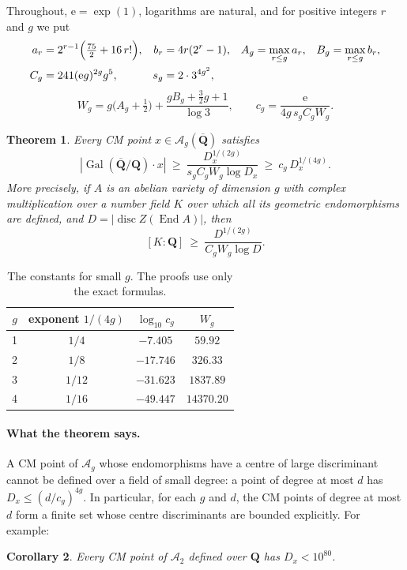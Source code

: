 \documentclass[11pt,a4paper]{article}
\theoremstyle{plain}
\newtheorem{theorem}{Theorem}
\newtheorem{corollary}[theorem]{Corollary}
\theoremstyle{remark}
\newcommand{\Q}{\mathbf Q}
\newcommand{\Ag}{\mathcal A_g}
\newcommand{\Gal}{\operatorname{Gal}}
\newcommand{\End}{\operatorname{End}}
\newcommand{\disc}{\operatorname{disc}}
\newcommand{\Qb}{\overline{\mathbf Q}}
\begin{document}
Throughout, $\mathrm e=\exp(1)$, logarithms are natural, and for positive integers $r$ and $g$ we put
\begin{align*}
 a_r&=2^{r-1}\Bigl(\tfrac{75}2+16\,r!\Bigr),& b_r&=4r(2^r-1),&
 A_g&=\max_{r\leq g}a_r,& B_g&=\max_{r\leq g}b_r,\\
 C_g&=241(\mathrm eg)^{2g}g^5,& s_g&=2\cdot3^{4g^2},
\end{align*}
\[
 W_g=g\bigl(A_g+\tfrac12\bigr)+\frac{gB_g+\tfrac32g+1}{\log3},\qquad
 c_g=\frac{\mathrm e}{4g\,s_gC_gW_g}.
\]

\begin{theorem}\label{thm:main}
Every CM point $x\in\Ag(\Qb)$ satisfies
\[
 |\Gal(\Qb/\Q)\cdot x|\ \geq\ \frac{D_x^{1/(2g)}}{s_gC_gW_g\log D_x}\ \geq\ c_g\,D_x^{1/(4g)}.
 \tag{1.1}
\]
More precisely, if $A$ is an abelian variety of dimension $g$ with complex multiplication over a number field $K$
over which all its geometric endomorphisms are defined, and $D=|\disc Z(\End A)|$, then
\[
 [K:\Q]\ \geq\ \frac{D^{1/(2g)}}{C_gW_g\log D}.
 \tag{1.2}
\]
\end{theorem}

\begin{table}[ht]
\centering
\begin{tabular}{@{}cccc@{}}
\toprule
$g$ & exponent $1/(4g)$ & $\log_{10}c_g$ & $W_g$\\
\midrule
1&$1/4$&$-7.405$&$59.92$\\
2&$1/8$&$-17.746$&$326.33$\\
3&$1/12$&$-31.623$&$1837.89$\\
4&$1/16$&$-49.447$&$14370.20$\\
\bottomrule
\end{tabular}
\caption{The constants for small $g$. The proofs use only the exact formulas.}
\end{table}

\paragraph{What the theorem says.}
A CM point of $\Ag$ whose endomorphisms have a centre of large discriminant cannot be defined over a field of small
degree: a point of degree at most $d$ has $D_x\leq(d/c_g)^{4g}$. In particular, for each $g$ and $d$, the CM points
of degree at most $d$ form a finite set whose centre discriminants are bounded explicitly. For example:

\begin{corollary}\label{cor:surfaces}
Every CM point of $\mathcal A_2$ defined over $\Q$ has $D_x<10^{80}$.
\end{corollary}
\end{document}
